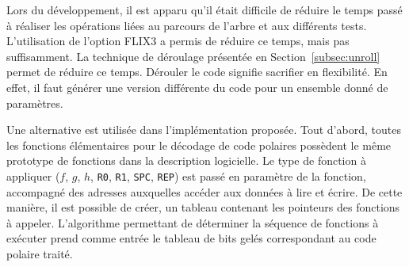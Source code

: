 Lors du développement, il est apparu qu'il était difficile de réduire le temps passé à réaliser les opérations liées au parcours de l'arbre et aux différents tests. L'utilisation de l'option FLIX3 a permis de réduire ce temps, mais pas suffisamment. La technique de déroulage présentée en Section~\ref{subsec:unroll} permet de réduire ce temps. Dérouler le code signifie sacrifier en flexibilité. En effet, il faut générer une version différente du code pour un ensemble donné de paramètres.

Une alternative est utilisée dans l'implémentation proposée. Tout d'abord, toutes les fonctions élémentaires pour le décodage de code polaires possèdent le même prototype de fonctions dans la description logicielle. Le type de fonction à appliquer ($f$, $g$, $h$, \texttt{R0}, \texttt{R1}, \texttt{SPC}, \texttt{REP}) est passé en paramètre de la fonction, accompagné des adresses auxquelles accéder aux données à lire et écrire. De cette manière, il est possible de créer, un tableau contenant les pointeurs des fonctions à appeler. L'algorithme permettant de déterminer la séquence de fonctions à exécuter prend comme entrée le tableau de bits gelés correspondant au code polaire traité.


